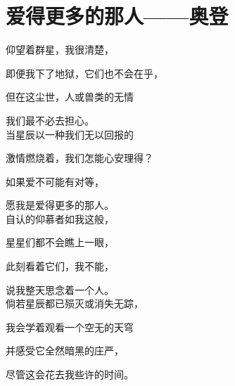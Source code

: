 \section{爱得更多的那人——奥登}

仰望着群星，我很清楚，

即便我下了地狱，它们也不会在乎，

但在这尘世，人或兽类的无情

我们最不必去担心。\\


当星辰以一种我们无以回报的

激情燃烧着，我们怎能心安理得？

如果爱不可能有对等，

愿我是爱得更多的那人。\\


自认的仰慕者如我这般，

星星们都不会瞧上一眼，

此刻看着它们，我不能，

说我整天思念着一个人。\\


倘若星辰都已殒灭或消失无踪，

我会学着观看一个空无的天穹

并感受它全然暗黑的庄严，

尽管这会花去我些许的时间。